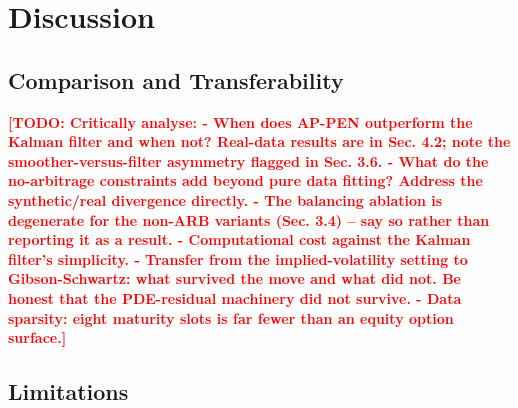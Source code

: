 \documentclass[11pt, a4paper]{article}
\newcommand{\todo}[1]{\textcolor{red}{\textbf{[TODO: #1]}}}
\begin{document}



\clearpage
\section{Discussion}
\label{sec:discussion}

\subsection{Comparison and Transferability}
\label{sec:disc_comparison}

\todo{Critically analyse:
  - When does AP-PEN outperform the Kalman filter and when not? Real-data
    results are in Sec. 4.2; note the smoother-versus-filter asymmetry flagged
    in Sec. 3.6.
  - What do the no-arbitrage constraints add beyond pure data fitting? Address
    the synthetic/real divergence directly.
  - The balancing ablation is degenerate for the non-ARB variants (Sec. 3.4) --
    say so rather than reporting it as a result.
  - Computational cost against the Kalman filter's simplicity.
  - Transfer from the implied-volatility setting to Gibson-Schwartz: what
    survived the move and what did not. Be honest that the PDE-residual
    machinery did not survive.
  - Data sparsity: eight maturity slots is far fewer than an equity option
    surface.}

\subsection{Limitations}
\label{sec:disc_limitations}
\end{document}
